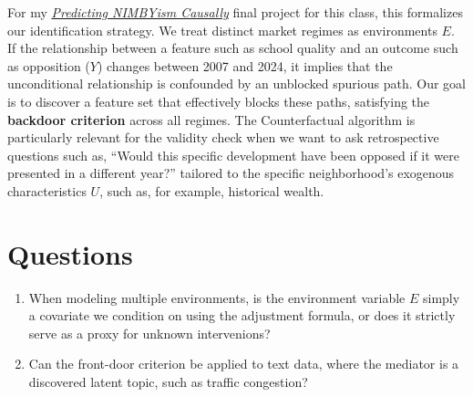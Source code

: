 \documentclass[11pt]{article}
\begin{document}
For my \href{https://github.com/dhardestylewis/thesis/blob/main/Blei-Invariance_Causality-2026Spring/Project_Proposal.d/Project_Proposal_Final_V21.pdf}{\textit{Predicting NIMBYism Causally}} final project for this class, this formalizes our identification strategy. We treat distinct market regimes as environments $E$. If the relationship between a feature such as school quality and an outcome such as opposition ($Y$) changes between 2007 and 2024, it implies that the unconditional relationship is confounded by an unblocked spurious path. Our goal is to discover a feature set that effectively blocks these paths, satisfying the \textbf{backdoor criterion} across all regimes. The Counterfactual algorithm is particularly relevant for the validity check when we want to ask retrospective questions such as, ``Would this specific development have been opposed if it were presented in a different year?'' tailored to the specific neighborhood's exogenous characteristics $U$, such as, for example, historical wealth.

\section*{Questions}
\begin{enumerate}
    \item When modeling multiple environments, is the environment variable $E$ simply a covariate we condition on using the adjustment formula, or does it strictly serve as a proxy for unknown intervenions?
    \item Can the front-door criterion be applied to text data, where the mediator is a discovered latent topic, such as traffic congestion?
\end{enumerate}
\end{document}
